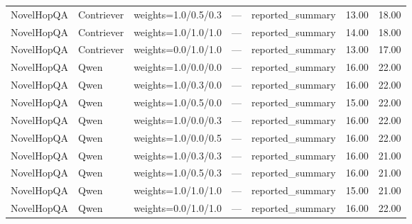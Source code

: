 \begin{tabular}{lllllll}
NovelHopQA & Contriever & weights=1.0/0.5/0.3 & — & reported\_summary & 13.00 & 18.00 \\
NovelHopQA & Contriever & weights=1.0/1.0/1.0 & — & reported\_summary & 14.00 & 18.00 \\
NovelHopQA & Contriever & weights=0.0/1.0/1.0 & — & reported\_summary & 13.00 & 17.00 \\
NovelHopQA & Qwen & weights=1.0/0.0/0.0 & — & reported\_summary & 16.00 & 22.00 \\
NovelHopQA & Qwen & weights=1.0/0.3/0.0 & — & reported\_summary & 16.00 & 22.00 \\
NovelHopQA & Qwen & weights=1.0/0.5/0.0 & — & reported\_summary & 15.00 & 22.00 \\
NovelHopQA & Qwen & weights=1.0/0.0/0.3 & — & reported\_summary & 16.00 & 22.00 \\
NovelHopQA & Qwen & weights=1.0/0.0/0.5 & — & reported\_summary & 16.00 & 22.00 \\
NovelHopQA & Qwen & weights=1.0/0.3/0.3 & — & reported\_summary & 16.00 & 21.00 \\
NovelHopQA & Qwen & weights=1.0/0.5/0.3 & — & reported\_summary & 16.00 & 21.00 \\
NovelHopQA & Qwen & weights=1.0/1.0/1.0 & — & reported\_summary & 15.00 & 21.00 \\
NovelHopQA & Qwen & weights=0.0/1.0/1.0 & — & reported\_summary & 16.00 & 22.00 \\
\hline
\end{tabular}
